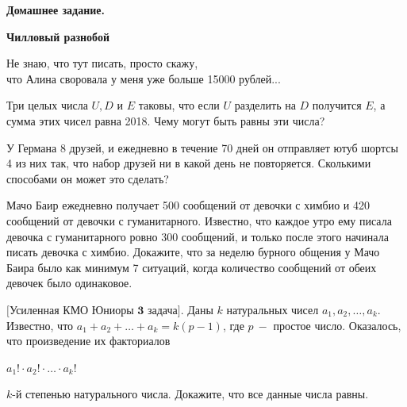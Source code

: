 \hspace{3mm}

\centerline{\bf \Huge Домашнее задание.}
\centerline{\bf \Huge Чилловый разнобой}

\begin{flushright}
    \scriptsize{Не знаю, что тут писать, просто скажу, \\что Алина своровала у меня уже больше 15000 рублей...}
\end{flushright}

 Три целых числа $U, D$ и $E$ таковы, что если $U$ разделить на $D$ получится $E$, а сумма этих чисел равна 2018. Чему могут быть равны эти числа?

 У Германа 8 друзей, и ежедневно в течение 70 дней он отправляет ютуб шортсы 4 из них так, что набор друзей ни в какой день не повторяется. Сколькими способами он может это сделать?

 Мачо Баир ежедневно получает 500 сообщений от девочки с химбио и 420 сообщений от девочки с гуманитарного. Известно, что каждое утро ему писала девочка с гуманитарного ровно 300 сообщений, и только после этого начинала писать девочка с химбио. Докажите, что за неделю бурного общения у Мачо Баира было как минимум 7 ситуаций, когда количество сообщений от обеих девочек было одинаковое.

$\bigl[ \textbf{Усиленная КМО Юниоры 3 задача} \bigr]$. Даны $k$ натуральных чисел $a_1, a_2, \dotsc , a_k$. Известно, что $a_1+a_2+\dotsc+a_k = k(p-1)$, где $p \ -$ простое число. Оказалось, что произведение их факториалов 

\centerline{$a_1!\cdot a_2!\cdot \dotsc \cdot a_k!$}

 $k$-й степенью натурального числа. Докажите, что все данные числа равны.